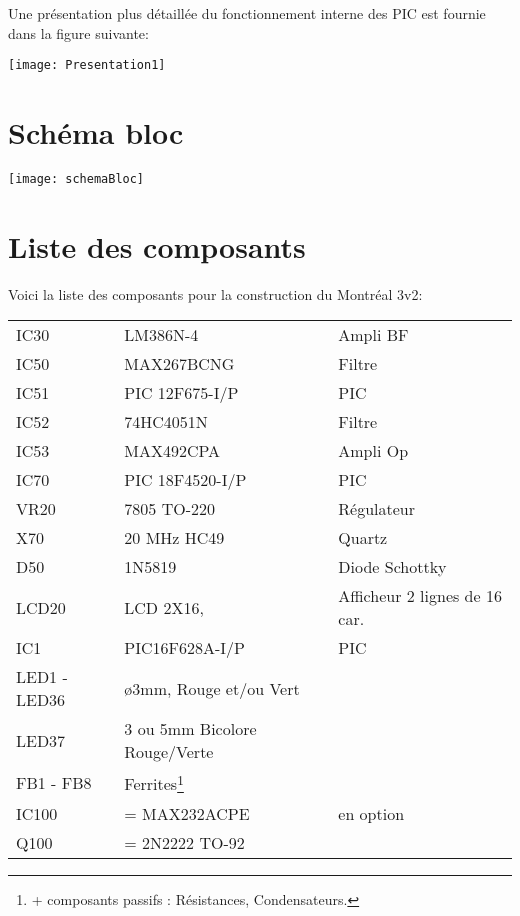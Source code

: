 Une présentation plus détaillée du fonctionnement interne des PIC est fournie dans la figure suivante:


\texttt{[image: Presentation1]}



\section{Schéma bloc}

\texttt{[image: schemaBloc]}

\section{Liste des composants}
Voici la liste des composants pour la construction du Montréal 3v2:

\begin{tabular}{ l l l}

IC30&          LM386N-4&                  Ampli BF\\
IC50&          MAX267BCNG&          Filtre\\
IC51& PIC  12F675-I/P& PIC \\
IC52&          74HC4051N&               Filtre\\
IC53&          MAX492CPA &            Ampli Op\\
IC70& PIC  18F4520-I/P& PIC\\
VR20 &       7805 TO-220  &            Régulateur\\
X70&           20 MHz  HC49&           Quartz\\
D50&           1N5819       &                Diode Schottky\\
LCD20&      LCD 2X16,&                 Afficheur 2 lignes de 16 car.\\
IC1& PIC16F628A-I/P& PIC\\
LED1 - LED36& ø3mm, Rouge et/ou Vert&\\
LED37&                        3 ou 5mm Bicolore Rouge/Verte &\\
FB1 - FB8&                   Ferrites\footnote{+ composants passifs : Résistances, Condensateurs.}&\\
IC100&        = MAX232ACPE&        en option\\
Q100 &        = 2N2222 TO-92&\\
\end{tabular}

